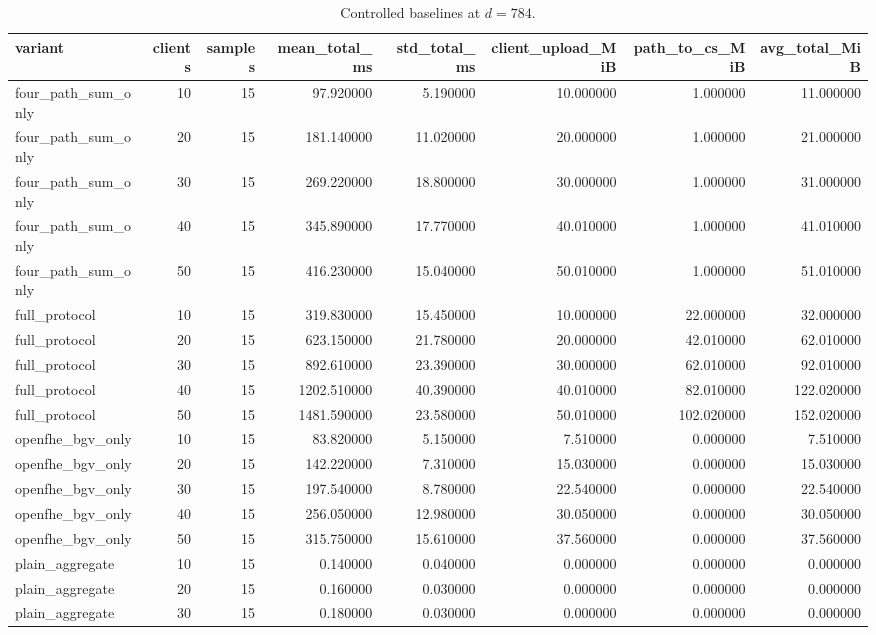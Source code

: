 \begin{table}
\caption{Controlled baselines at $d=784$.}
\label{tab:eval-baselines}
\begin{tabular}{lrrrrrrr}
\toprule
variant & clients & samples & mean_total_ms & std_total_ms & client_upload_MiB & path_to_cs_MiB & avg_total_MiB \\
\midrule
four_path_sum_only & 10 & 15 & 97.920000 & 5.190000 & 10.000000 & 1.000000 & 11.000000 \\
four_path_sum_only & 20 & 15 & 181.140000 & 11.020000 & 20.000000 & 1.000000 & 21.000000 \\
four_path_sum_only & 30 & 15 & 269.220000 & 18.800000 & 30.000000 & 1.000000 & 31.000000 \\
four_path_sum_only & 40 & 15 & 345.890000 & 17.770000 & 40.010000 & 1.000000 & 41.010000 \\
four_path_sum_only & 50 & 15 & 416.230000 & 15.040000 & 50.010000 & 1.000000 & 51.010000 \\
full_protocol & 10 & 15 & 319.830000 & 15.450000 & 10.000000 & 22.000000 & 32.000000 \\
full_protocol & 20 & 15 & 623.150000 & 21.780000 & 20.000000 & 42.010000 & 62.010000 \\
full_protocol & 30 & 15 & 892.610000 & 23.390000 & 30.000000 & 62.010000 & 92.010000 \\
full_protocol & 40 & 15 & 1202.510000 & 40.390000 & 40.010000 & 82.010000 & 122.020000 \\
full_protocol & 50 & 15 & 1481.590000 & 23.580000 & 50.010000 & 102.020000 & 152.020000 \\
openfhe_bgv_only & 10 & 15 & 83.820000 & 5.150000 & 7.510000 & 0.000000 & 7.510000 \\
openfhe_bgv_only & 20 & 15 & 142.220000 & 7.310000 & 15.030000 & 0.000000 & 15.030000 \\
openfhe_bgv_only & 30 & 15 & 197.540000 & 8.780000 & 22.540000 & 0.000000 & 22.540000 \\
openfhe_bgv_only & 40 & 15 & 256.050000 & 12.980000 & 30.050000 & 0.000000 & 30.050000 \\
openfhe_bgv_only & 50 & 15 & 315.750000 & 15.610000 & 37.560000 & 0.000000 & 37.560000 \\
plain_aggregate & 10 & 15 & 0.140000 & 0.040000 & 0.000000 & 0.000000 & 0.000000 \\
plain_aggregate & 20 & 15 & 0.160000 & 0.030000 & 0.000000 & 0.000000 & 0.000000 \\
plain_aggregate & 30 & 15 & 0.180000 & 0.030000 & 0.000000 & 0.000000 & 0.000000 \\

\end{tabular}
\end{table}
